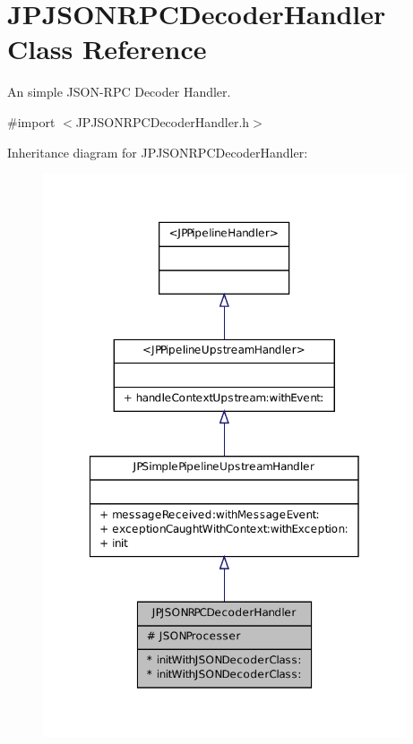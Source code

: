 \hypertarget{a00015}{
\section{JPJSONRPCDecoderHandler Class Reference}
\label{a00015}
}


An simple JSON-\/RPC Decoder Handler.  




{\ttfamily \#import $<$JPJSONRPCDecoderHandler.h$>$}



Inheritance diagram for JPJSONRPCDecoderHandler:\nopagebreak
\begin{figure}[H]
\begin{center}
\leavevmode
\includegraphics[width=304pt]{a00106}
\end{center}
\end{figure}


